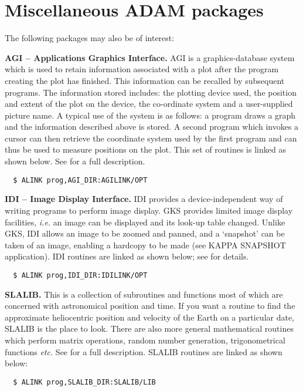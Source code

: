 \newpage
\section{Miscellaneous ADAM packages\label{misc}}

The following packages may also be of interest:
\begin{description}
\item{\bf AGI -- Applications Graphics Interface.} AGI is a graphics-database 
system  which is used to retain information associated with a plot after the
program creating the plot has finished. This information can be recalled 
by subsequent programs.
The information stored includes: the plotting device used, 
the position  and extent of the plot on the device, the 
co-ordinate system and a user-supplied picture name.
A typical use of the system is as follows: a program draws a graph
and the information described above is stored.
A second program which invokes a cursor 
can then retrieve the coordinate system used by the first
program and can thus be used to measure positions on the plot.
This set of routines is linked as shown below.
See  for a full description.
\begin{verbatim}
  $ ALINK prog,AGI_DIR:AGILINK/OPT
\end{verbatim}

\item{\bf IDI -- Image Display Interface.} 
IDI provides a device-independent way of writing programs to perform 
image display. 
GKS provides limited image display facilities, {\it i.e.} an image can be 
displayed  and  its look-up table changed.
Unlike GKS, IDI allows an image to be zoomed and panned, and a 
`snapshot' can be taken of an image, enabling a hardcopy to be made 
(see KAPPA SNAPSHOT application).
IDI routines are linked as shown below; see  for details.
\begin{verbatim}
  $ ALINK prog,IDI_DIR:IDILINK/OPT
\end{verbatim}
 
\item{\bf SLALIB.} This is a collection of subroutines and functions
most of which are concerned with astronomical position and time.
If you want a routine to find the approximate heliocentric position and 
velocity of the Earth on a particular date, SLALIB is the place to look.
There are also more general mathematical routines which perform
matrix operations, random number generation, trigonometrical functions
{\it etc.}
See  for a full description.
SLALIB routines are linked as shown below:
\begin{verbatim}
  $ ALINK prog,SLALIB_DIR:SLALIB/LIB
\end{verbatim}


\end{description}
